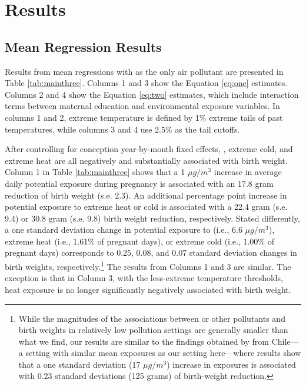 \section{Results\label{results}}

\subsection{Mean Regression Results\label{mean-regression-results}}

Results from mean regressions with \PARPMTEN as the only air pollutant are
presented in Table \ref{tab:mainthree}. Columns 1 and 3 show the Equation \eqref{eq:one} estimates.
Columns 2 and 4 show the Equation \eqref{eq:two} estimates, which include
interaction terms between maternal education and environmental exposure
variables. In columns 1 and 2, extreme temperature is defined by 1\% extreme tails of past temperatures, while columns 3 and 4 use
2.5\% as the tail cutoffs.

After controlling for conception year-by-month fixed effects, \PARPMTEN,
extreme cold, and extreme heat are all negatively and substantially
associated with birth weight. Column 1 in Table \ref{tab:mainthree} shows that a 1 $\mu g/m^3$
increase in average daily \PARPMTEN potential exposure during pregnancy is
associated with an 17.8 gram reduction of birth weight (s.e. 2.3). An
additional percentage point increase in potential exposure to extreme
heat or cold is associated with a 22.4 gram (s.e. 9.4) or 30.8 gram (s.e. 9.8)
birth weight reduction, respectively. Stated differently, a one
standard deviation change in potential exposure to \PARPMTEN (i.e., 6.6
$\mu g/m^3$), extreme heat (i.e., 1.61\% of pregnant days), or extreme cold (i.e., 1.00\% of pregnant days) corresponds to 0.25, 0.08, and 0.07 standard
deviation changes in birth weights, respectively.\footnote{While the
  magnitudes of the associations between \PARPMTEN or other pollutants and
  birth weights in relatively low pollution settings are generally smaller
  than what we find, our results are similar to the findings
  obtained by \textcite{bharadwaj_atmospheric_2008} from Chile---a setting with
  similar mean \PARPMTEN exposures as our setting here---where results show that
  a one standard deviation (17 $\mu g/m^3$) increase in \PARPMTEN exposures is
  associated with 0.23 standard deviations (125 grams) of birth-weight
  reduction.} The results from Columns 1 and 3 are similar. The
exception is that in Column 3, with the less-extreme temperature
thresholds, heat exposure is no longer significantly negatively associated with birth
weight.

